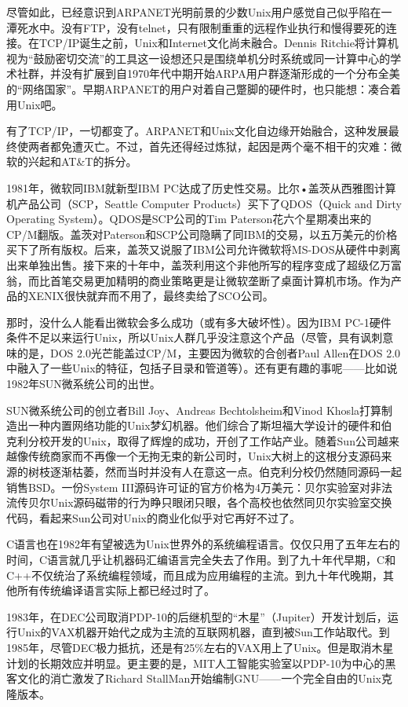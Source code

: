 \documentclass[12pt,oneside]{book}
\begin{document}
尽管如此，已经意识到ARPANET光明前景的少数Unix用户感觉自己似乎陷在一潭死水中。没有FTP，没有telnet，只有限制重重的远程作业执行和慢得要死的连接。在TCP/IP诞生之前，Unix和Internet文化尚未融合。Dennis Ritchie将计算机视为“鼓励密切交流”的工具这一设想还只是围绕单机分时系统或同一计算中心的学术社群，并没有扩展到自1970年代中期开始ARPA用户群逐渐形成的一个分布全美的“网络国家”。早期ARPANET的用户对着自己蹩脚的硬件时，也只能想：凑合着用Unix吧。

有了TCP/IP，一切都变了。ARPANET和Unix文化自边缘开始融合，这种发展最终使两者都免遭灭亡。不过，首先还得经过炼狱，起因是两个毫不相干的灾难：微软的兴起和AT\&{}T的拆分。

1981年，微软同IBM就新型IBM PC达成了历史性交易。比尔•盖茨从西雅图计算机产品公司（SCP，Seattle Computer Products）买下了QDOS（Quick and Dirty Operating System）。QDOS是SCP公司的Tim Paterson花六个星期凑出来的CP/M翻版。盖茨对Paterson和SCP公司隐瞒了同IBM的交易，以五万美元的价格买下了所有版权。后来，盖茨又说服了IBM公司允许微软将MS-DOS从硬件中剥离出来单独出售。接下来的十年中，盖茨利用这个非他所写的程序变成了超级亿万富翁，而比首笔交易更加精明的商业策略更是让微软垄断了桌面计算机市场。作为产品的XENIX很快就弃而不用了，最终卖给了SCO公司。

那时，没什么人能看出微软会多么成功（或有多大破坏性）。因为IBM PC-1硬件条件不足以来运行Unix，所以Unix人群几乎没注意这个产品（尽管，具有讽刺意味的是，DOS 2.0光芒能盖过CP/M，主要因为微软的合创者Paul Allen在DOS 2.0中融入了一些Unix的特征，包括子目录和管道等）。还有更有趣的事呢——比如说1982年SUN微系统公司的出世。

SUN微系统公司的创立者Bill Joy、Andreas Bechtolsheim和Vinod Khosla打算制造出一种内置网络功能的Unix梦幻机器。他们综合了斯坦福大学设计的硬件和伯克利分校开发的Unix，取得了辉煌的成功，开创了工作站产业。随着Sun公司越来越像传统商家而不再像一个无拘无束的新公司时，Unix大树上的这根分支源码来源的树枝逐渐枯萎，然而当时并没有人在意这一点。伯克利分校仍然随同源码一起销售BSD。一份System III源码许可证的官方价格为4万美元：贝尔实验室对非法流传贝尔Unix源码磁带的行为睁只眼闭只眼，各个高校也依然同贝尔实验室交换代码，看起来Sun公司对Unix的商业化似乎对它再好不过了。

C语言也在1982年有望被选为Unix世界外的系统编程语言。仅仅只用了五年左右的时间，C语言就几乎让机器码汇编语言完全失去了作用。到了九十年代早期，C和C++不仅统治了系统编程领域，而且成为应用编程的主流。到九十年代晚期，其他所有传统编译语言实际上都已经过时了。

1983年，在DEC公司取消PDP-10的后继机型的“木星”（Jupiter）开发计划后，运行Unix的VAX机器开始代之成为主流的互联网机器，直到被Sun工作站取代。到1985年，尽管DEC极力抵抗，还是有25\%{}左右的VAX用上了Unix。但是取消木星计划的长期效应并明显。更主要的是，MIT人工智能实验室以PDP-10为中心的黑客文化的消亡激发了Richard StallMan开始编制GNU——一个完全自由的Unix克隆版本。
\end{document}
